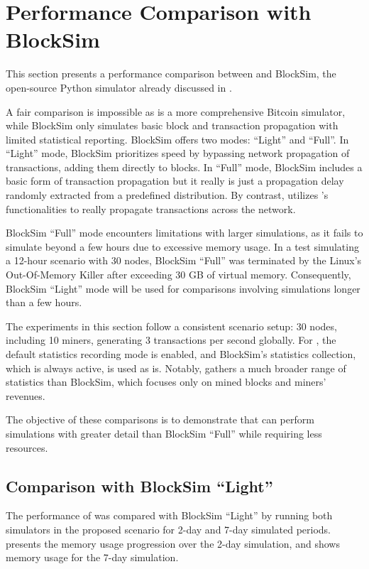 \section{Performance Comparison with BlockSim}\label{sec:comparison}

This section presents a performance comparison between \iblock{} and BlockSim,
the open-source Python simulator already discussed in 
\cite{blocksim}.

A fair comparison is impossible as \iblock{} is a more comprehensive Bitcoin
simulator, while BlockSim only simulates basic block and transaction
propagation with limited statistical reporting. BlockSim offers two modes:
``Light'' and ``Full''. In ``Light'' mode, BlockSim prioritizes speed by bypassing
network propagation of transactions, adding them directly to blocks. In
``Full''
mode, BlockSim includes a basic form of transaction propagation but it really
is just a propagation delay randomly extracted from a predefined distribution.
By contrast, \iblock{} utilizes \omnetpp's functionalities to really propagate
transactions across the network.

BlockSim ``Full'' mode encounters limitations with larger simulations, as it
fails to simulate beyond a few hours due to excessive memory usage. In a test
simulating a 12-hour scenario with 30 nodes, BlockSim ``Full'' was terminated
by the Linux's Out-Of-Memory Killer after exceeding 30 GB of virtual memory.
Consequently, BlockSim ``Light'' mode will be used for comparisons involving
simulations longer than a few hours.

The experiments in this section follow a consistent scenario setup: 30 nodes,
including 10 miners, generating 3 transactions per second globally. For
\iblock{}, the default statistics recording mode is enabled, and BlockSim's
statistics collection, which is always active, is used as is. Notably,
\iblock{} gathers a much broader range of statistics than BlockSim, which
focuses only on mined blocks and miners' revenues.

The objective of these comparisons is to demonstrate that \iblock{} can perform
simulations with greater detail than BlockSim ``Full'' while requiring less
resources.

\subsection{Comparison with BlockSim ``Light''}

The performance of \iblock{} was compared with BlockSim ``Light'' by running
both simulators in the proposed scenario for 2-day and 7-day simulated periods.
 presents the memory usage progression over the
2-day simulation, and  shows memory usage for
the 7-day simulation.

